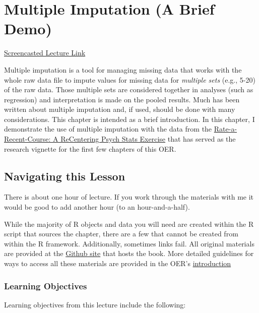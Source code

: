 \documentclass[
  english,
]{book}
\begin{document}
\hypertarget{multimp}{%
\chapter{Multiple Imputation (A Brief Demo)}\label{multimp}}

\href{https://spu.hosted.panopto.com/Panopto/Pages/Viewer.aspx?pid=94d59efe-3f02-4c65-b068-ad01003e09a9}{Screencasted Lecture Link}

Multiple imputation is a tool for managing missing data that works with the whole raw data file to impute values for missing data for \emph{multiple sets} (e.g., 5-20) of the raw data. Those multiple sets are considered together in analyses (such as regression) and interpretation is made on the pooled results. Much has been written about multiple imputation and, if used, should be done with many considerations. This chapter is intended as a brief introduction. In this chapter, I demonstrate the use of multiple imputation with the data from the \href{https://spupsych.az1.qualtrics.com/jfe/form/SV_b2cClqAlLGQ6nLU}{Rate-a-Recent-Course: A ReCentering Psych Stats Exercise} that has served as the research vignette for the first few chapters of this OER.

\hypertarget{navigating-this-lesson-3}{%
\section{Navigating this Lesson}\label{navigating-this-lesson-3}}

There is about one hour of lecture. If you work through the materials with me it would be good to add another hour (to an hour-and-a-half).

While the majority of R objects and data you will need are created within the R script that sources the chapter, there are a few that cannot be created from within the R framework. Additionally, sometimes links fail. All original materials are provided at the \href{https://github.com/lhbikos/ReC_MultivModel}{Github site} that hosts the book. More detailed guidelines for ways to access all these materials are provided in the OER's \protect\hyperlink{ReCintro}{introduction}

\hypertarget{learning-objectives-3}{%
\subsection{Learning Objectives}\label{learning-objectives-3}}

Learning objectives from this lecture include the following:
\end{document}
